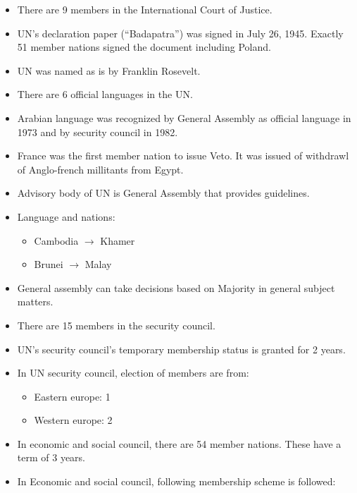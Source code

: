 \documentclass[
  openany]{book}
\providecommand{\tightlist}{%
  \setlength{\itemsep}{0pt}\setlength{\parskip}{0pt}}
\begin{document}
\begin{itemize}
\item
  There are 9 members in the International Court of Justice.
\item
  UN's declaration paper (``Badapatra'') was signed in July 26, 1945. Exactly 51 member nations signed the document including Poland.
\item
  UN was named as is by Franklin Rosevelt.
\item
  There are 6 official languages in the UN.
\item
  Arabian language was recognized by General Assembly as official language in 1973 and by security council in 1982.
\item
  France was the first member nation to issue Veto. It was issued of withdrawl of Anglo-french millitants from Egypt.
\item
  Advisory body of UN is General Assembly that provides guidelines.
\item
  Language and nations:

  \begin{itemize}
  \tightlist
  \item
    Cambodia \(\longrightarrow\) Khamer
  \item
    Brunei \(\longrightarrow\) Malay
  \end{itemize}
\item
  General assembly can take decisions based on Majority in general subject matters.
\item
  There are 15 members in the security council.
\item
  UN's security council's temporary membership status is granted for 2 years.
\item
  In UN security council, election of members are from:

  \begin{itemize}
  \tightlist
  \item
    Eastern europe: 1
  \item
    Western europe: 2
  \end{itemize}
\item
  In economic and social council, there are 54 member nations. These have a term of 3 years.
\item
  In Economic and social council, following membership scheme is followed:


\end{itemize}
\end{document}
